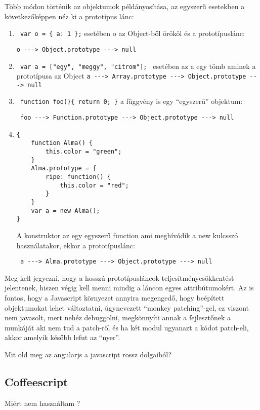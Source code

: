 Több módon történik az objektumok példányosítása, az egyszerű esetekben a következőképpen néz ki a prototípus lánc: 
\begin{enumerate}
\item \lstinline| var o = { a: 1 };| esetében o az Object-ből örököl és a prototípuslánc:

 \lstinline|o ---> Object.prototype ---> null|
\item \lstinline| var a = ["egy", "meggy", "citrom"]; | esetében az a egy tömb aminek a prototípusa az Object \lstinline|a ---> Array.prototype ---> Object.prototype ---> null|
\item \lstinline| function foo(){ return 0; }| a függvény is egy ``egyszerű'' objektum: 

\lstinline| foo ---> Function.prototype ---> Object.prototype ---> null| 

\item 
\begin{lstlisting}
{
    function Alma() {
        this.color = "green";
    }
    Alma.prototype = {
        ripe: function() {
            this.color = "red";
        } 
    }
    var a = new Alma();
}
\end{lstlisting}

A konstruktor az egy egyszerű function ami meghívódik a new kulcsszó használatakor, ekkor a prototípuslánc: 

\lstinline| a ---> Alma.prototype ---> Object.prototype ---> null|

\end{enumerate}

Meg kell jegyezni, hogy a hosszú prototípusláncok teljesítménycsökkentést jelentenek, hiszen végig kell menni mindig a láncon egyes attribútumokért. Az is fontos, hogy a Javascript környezet annyira megengedő, hogy beépített objektumokat lehet változtatni, úgynevezett ``monkey patching''-gel, ez viszont nem javasolt, mert nehéz debuggolni, megkönnyíti annak a fejlesztőnek a munkáját aki nem tud a patch-ről és ha két modul ugyanazt a kódot patch-eli, akkor amelyik később lefut az ``nyer''.





Mit old meg az angularjs a javascript rossz dolgaiból?

\subsection{Coffeescript}

Miért nem használtam ?

